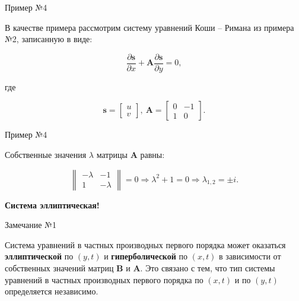 \documentclass[10pt,xcolor=pst,aspectratio=169]{beamer}
\begin{document}
\begin{frame}{Пример №4}

    \transdissolve[duration=0.1]
    \justifying
    \large

    В качестве примера рассмотрим систему уравнений Коши -- Римана из примера №2, записанную в виде:

    \[
        \frac{\partial \mathbf{s}}{\partial x} + \mathbf{A} \frac{\partial \mathbf{s}}{\partial y} = 0,
    \]

    где

    \[
        \mathbf{s}
        =
        \begin{bmatrix}
            u \\
            v
        \end{bmatrix}, \:
        \mathbf{A}
        =
        \begin{bmatrix}
            0 & - 1 \\
            1 & 0
        \end{bmatrix}.
    \]

\end{frame}

\begin{frame}{Пример №4}

    \transdissolve[duration=0.1]
    \justifying
    \large

    Собственные значения $\lambda$ матрицы $\mathbf{A}$ равны:

    \[
        \begin{Vmatrix}
            - \lambda & - 1 \\
            1 & - \lambda
        \end{Vmatrix}
        = 0
        \Rightarrow \lambda^2 + 1 = 0
        \Rightarrow \lambda_{1,2} = \pm i.
    \]

    \textbf{Система эллиптическая!}

\end{frame}

\begin{frame}{Замечание №1}

    \transdissolve[duration=0.1]
    \justifying
    \large

    Система уравнений в частных производных первого порядка может оказаться \textbf{эллиптической} по $(y,t)$ и \textbf{гиперболической} по $(x,t)$ в зависимости от собственных значений матриц $\mathbf{B}$ и $\mathbf{A}$. Это связано с тем, что тип системы уравнений в частных производных первого порядка по $(x,t)$ и по $(y,t)$ определяется независимо.

\end{frame}
\end{document}
